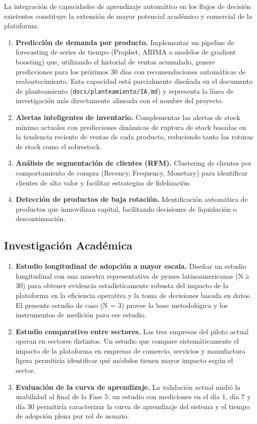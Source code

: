 La integración de capacidades de aprendizaje automático en los flujos de decisión existentes constituye la extensión de mayor potencial académico y comercial de la plataforma:

\begin{enumerate}
\def\labelenumi{\arabic{enumi}.}
\item
  \textbf{Predicción de demanda por producto.} Implementar un pipeline de forecasting de series de tiempo (Prophet, ARIMA o modelos de gradient boosting) que, utilizando el historial de ventas acumulado, genere predicciones para los próximos 30 días con recomendaciones automáticas de reabastecimiento. Esta capacidad está parcialmente diseñada en el documento de planteamiento (\texttt{docs/planteamiento/IA.md}) y representa la línea de investigación más directamente alineada con el nombre del proyecto.
\item
  \textbf{Alertas inteligentes de inventario.} Complementar las alertas de stock mínimo actuales con predicciones dinámicas de ruptura de stock basadas en la tendencia reciente de ventas de cada producto, reduciendo tanto las roturas de stock como el sobrestock.
\item
  \textbf{Análisis de segmentación de clientes (RFM).} Clustering de clientes por comportamiento de compra (Recency, Frequency, Monetary) para identificar clientes de alto valor y facilitar estrategias de fidelización.
\item
  \textbf{Detección de productos de baja rotación.} Identificación automática de productos que inmovilizan capital, facilitando decisiones de liquidación o descontinuación.
\end{enumerate}

\subsection{Investigación Académica}\label{investigaciuxf3n-acaduxe9mica}

\begin{enumerate}
\def\labelenumi{\arabic{enumi}.}
\item
  \textbf{Estudio longitudinal de adopción a mayor escala.} Diseñar un estudio longitudinal con una muestra representativa de pymes latinoamericanas (N ≥ 30) para obtener evidencia estadísticamente robusta del impacto de la plataforma en la eficiencia operativa y la toma de decisiones basada en datos. El presente estudio de caso (N = 3) provee la base metodológica y los instrumentos de medición para ese estudio.
\item
  \textbf{Estudio comparativo entre sectores.} Las tres empresas del piloto actual operan en sectores distintos. Un estudio que compare sistemáticamente el impacto de la plataforma en empresas de comercio, servicios y manufactura ligera permitiría identificar qué módulos tienen mayor impacto según el sector.
\item
  \textbf{Evaluación de la curva de aprendizaje.} La validación actual midió la usabilidad al final de la Fase 5; un estudio con mediciones en el día 1, día 7 y día 30 permitiría caracterizar la curva de aprendizaje del sistema y el tiempo de adopción plena por rol de usuario.
\end{enumerate}

